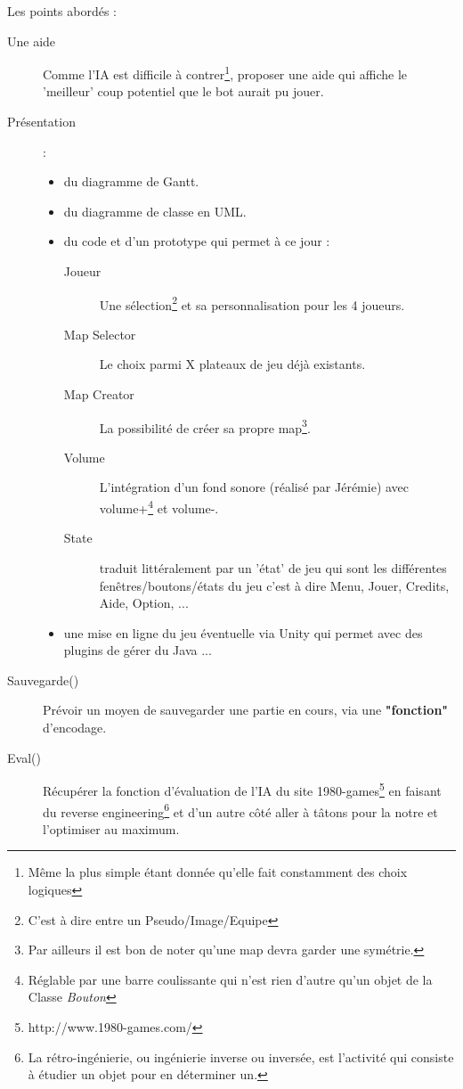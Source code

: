 \documentclass[11pt,a4paper]{article}
\begin{document}
Les points abordés :
\begin{description}
    
    \item[Une aide] Comme l'IA est difficile à contrer\footnote{Même la plus simple étant donnée qu'elle fait constamment des choix logiques}, proposer une aide qui affiche le 'meilleur' coup potentiel que le bot aurait pu jouer.
    
    \item[Présentation] :
        \begin{itemize}
            \item du diagramme de Gantt.
            \item du diagramme de classe en UML.
            \item du code et d'un prototype qui permet à ce jour :
            \begin{description}
                \item[Joueur] Une sélection\footnote{C'est à dire entre un Pseudo/Image/Equipe} et sa personnalisation pour les 4 joueurs.
                \item[Map Selector] Le choix parmi X plateaux de jeu déjà existants.
                \item[Map Creator] La possibilité de créer sa propre map\footnote{Par ailleurs il est bon de noter qu'une map devra garder une symétrie.}.  
                \item[Volume] L'intégration d'un fond sonore (réalisé par Jérémie) avec volume+\footnote{Réglable par une barre coulissante qui n'est rien d'autre qu'un objet de la Classe \textit{Bouton}} et volume-.
                \item[State] traduit littéralement par un 'état' de jeu qui sont les différentes fenêtres/boutons/états du jeu c'est à dire Menu, Jouer, Credits, Aide, Option, ...
            \end{description}
            \item une mise en ligne du jeu éventuelle via Unity qui permet avec des plugins de gérer du Java ...
        \end{itemize}
        
    \item[Sauvegarde()] Prévoir un moyen de sauvegarder une partie en cours, via une \textbf{"fonction"} d'encodage.
        
    \item[Eval()] Récupérer la fonction d'évaluation de l'IA du site 1980-games\footnote{http://www.1980-games.com/} en faisant du reverse engineering\footnote{La rétro-ingénierie, ou ingénierie inverse ou inversée, est l'activité qui consiste à étudier un objet pour en déterminer un.} et d'un autre côté aller à tâtons pour la notre et l'optimiser au maximum.
    

\end{description}
\end{document}
